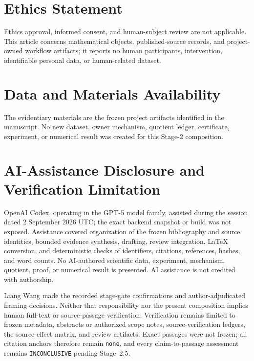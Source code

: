 \documentclass[11pt,a4paper]{article}
\begin{document}
\section*{Ethics Statement}
Ethics approval, informed consent, and human-subject review are not applicable. This article concerns mathematical objects, published-source records, and project-owned workflow artifacts; it reports no human participants, intervention, identifiable personal data, or human-related dataset.

\section*{Data and Materials Availability}
The evidentiary materials are the frozen project artifacts identified in the manuscript. No new dataset, owner mechanism, quotient ledger, certificate, experiment, or numerical result was created for this Stage-2 composition.

\section*{AI-Assistance Disclosure and Verification Limitation}
OpenAI Codex, operating in the GPT-5 model family, assisted during the session dated 2 September 2026 UTC; the exact backend snapshot or build was not exposed. Assistance covered organization of the frozen bibliography and source identities, bounded evidence synthesis, drafting, review integration, LaTeX conversion, and deterministic checks of identifiers, citations, references, hashes, and word counts. No AI-authored scientific data, experiment, mechanism, quotient, proof, or numerical result is presented. AI assistance is not credited with authorship.

Liang Wang made the recorded stage-gate confirmations and author-adjudicated framing decisions. Neither that responsibility nor the present composition implies human full-text or source-passage verification. Verification remains limited to frozen metadata, abstracts or authorized scope notes, source-verification ledgers, the source-effect matrix, and review artifacts. Exact passages were not frozen; all citation anchors therefore remain \texttt{none}, and every claim-to-passage assessment remains \texttt{INCONCLUSIVE} pending Stage~2.5.



\end{document}
